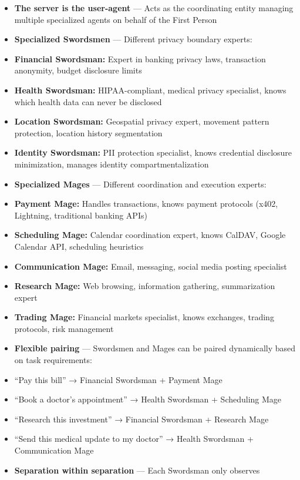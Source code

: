\documentclass[
  11pt,
]{article}
\begin{document}
\begin{itemize}
\item
  \textbf{The server is the user-agent} --- Acts as the coordinating
  entity managing multiple specialized agents on behalf of the First
  Person
\item
  \textbf{Specialized Swordsmen} --- Different privacy boundary experts:
\item
  \textbf{Financial Swordsman:} Expert in banking privacy laws,
  transaction anonymity, budget disclosure limits
\item
  \textbf{Health Swordsman:} HIPAA-compliant, medical privacy
  specialist, knows which health data can never be disclosed
\item
  \textbf{Location Swordsman:} Geospatial privacy expert, movement
  pattern protection, location history segmentation
\item
  \textbf{Identity Swordsman:} PII protection specialist, knows
  credential disclosure minimization, manages identity
  compartmentalization
\item
  \textbf{Specialized Mages} --- Different coordination and execution
  experts:
\item
  \textbf{Payment Mage:} Handles transactions, knows payment protocols
  (x402, Lightning, traditional banking APIs)
\item
  \textbf{Scheduling Mage:} Calendar coordination expert, knows CalDAV,
  Google Calendar API, scheduling heuristics
\item
  \textbf{Communication Mage:} Email, messaging, social media posting
  specialist
\item
  \textbf{Research Mage:} Web browsing, information gathering,
  summarization expert
\item
  \textbf{Trading Mage:} Financial markets specialist, knows exchanges,
  trading protocols, risk management
\item
  \textbf{Flexible pairing} --- Swordsmen and Mages can be paired
  dynamically based on task requirements:
\item
  ``Pay this bill'' → Financial Swordsman + Payment Mage
\item
  ``Book a doctor's appointment'' → Health Swordsman + Scheduling Mage
\item
  ``Research this investment'' → Financial Swordsman + Research Mage
\item
  ``Send this medical update to my doctor'' → Health Swordsman +
  Communication Mage
\item
  \textbf{Separation within separation} --- Each Swordsman only observes

\end{itemize}
\end{document}
